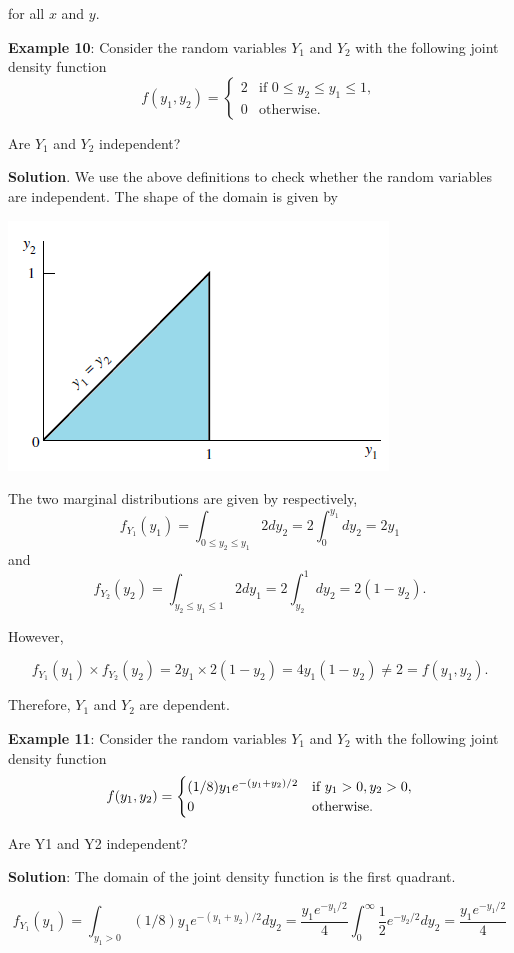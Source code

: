 \documentclass[
]{book}
\begin{document}
for all \(x\) and \(y\).

\hfill\break

\textbf{Example 10}: Consider the random variables \(Y_1\) and \(Y_2\) with the following joint density function
\[
\displaystyle f(y_1, y_2) = \begin{cases} 
 2 & \text{if  $0 \le y_2 \le y_1 \le 1$}, \\  
 0 & \text{otherwise}.
 \end{cases}
\]

Are \(Y_1\) and \(Y_2\) independent?

\textbf{Solution}. We use the above definitions to check whether the random variables are independent. The shape of the domain is given by

\begin{center}\includegraphics[width=0.45\linewidth]{topic07/example10Domain} \end{center}

The two marginal distributions are given by respectively,
\[
f_{Y_1}(y_1) = \int_{0 \le y_2 \le y_1} 2dy_2 = 2\int_0^{y_1}dy_2=2y_1
\]
and
\[
f_{Y_2}(y_2) = \int_{y_2 \le y_1 \le 1} 2dy_1 = 2\int_{y_2}^{1}dy_2=2(1-y_2).
\]

However,

\[
f_{Y_1}(y_1)\times f_{Y_2}(y_2) = 2y_1\times 2(1-y_2)=4y_1(1-y_2) \ne 2 = f(y_1, y_2).
\]

Therefore, \(Y_1\) and \(Y_2\) are dependent.

\textbf{Example 11}: Consider the random variables \(Y_1\) and \(Y_2\) with the following joint density function
\[
\displaystyle f(y_1, y_2) = \begin{cases} 
 (1/8)y_1e^{-(y_1+y_2)/2} & \text{if  $ y_1 > 0,  y_2 > 0$}, \\  
 0 & \text{otherwise}.
 \end{cases}
\]

Are Y1 and Y2 independent?

\textbf{Solution}: The domain of the joint density function is the first quadrant.

\[
f_{Y_1}(y_1) = \int_{y_1>0}  (1/8)y_1e^{-(y_1+y_2)/2} dy_2 = \frac{y_1e^{-y_1/2}}{4}\int_0^\infty \frac{1}{2}e^{-y_2/2}dy_2=\frac{y_1e^{-y_1/2}}{4}
\]
\end{document}
